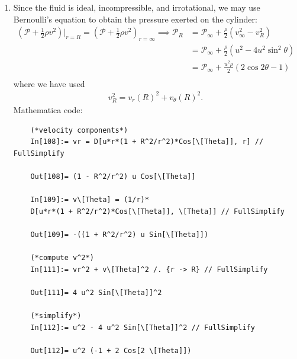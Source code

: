 \documentclass{article}
\theoremstyle{definition}
\newcommand{\f}[2]{\frac{#1}{#2}}
\newcommand{\lp}{\left(}
\newcommand{\rp}{\right)}
\begin{document}
\begin{enumerate}[label=(\alph*)]
	\item Since the fluid is ideal, incompressible, and irrotational, we may use Bernoulli's equation to obtain the pressure exerted on the cylinder: 
	\begin{align*}
	\lp \mathcal{P} + \f{1}{2}\rho v^2 \rp\bigg\vert_{r= R} = \lp \mathcal{P} + \f{1}{2}\rho v^2  \rp_{r=\infty} \implies \mathcal{P}_R
	& = \mathcal{P}_\infty + \f{\rho}{2}(v^2_\infty - {v^2_R})\\ 
	&= \mathcal{P}_\infty + \f{\rho}{2}(u^2 - 4u^2\sin^2\theta) \\
	&= \boxed{\mathcal{P}_\infty + \f{u^2\rho}{2}(2\cos 2 \theta - 1)} \\
	\end{align*}
	where we have used 
	\begin{align*}
	v_R^2 = v_r(R)^2 + v_\theta(R)^2.
	\end{align*}
	Mathematica code:
	\begin{lstlisting}
	(*velocity components*)
	In[108]:= vr = D[u*r*(1 + R^2/r^2)*Cos[\[Theta]], r] // FullSimplify
	
	Out[108]= (1 - R^2/r^2) u Cos[\[Theta]]
	
	In[109]:= v\[Theta] = (1/r)*
	D[u*r*(1 + R^2/r^2)*Cos[\[Theta]], \[Theta]] // FullSimplify
	
	Out[109]= -((1 + R^2/r^2) u Sin[\[Theta]])
	
	(*compute v^2*)
	In[111]:= vr^2 + v\[Theta]^2 /. {r -> R} // FullSimplify
	
	Out[111]= 4 u^2 Sin[\[Theta]]^2
	
	(*simplify*)
	In[112]:= u^2 - 4 u^2 Sin[\[Theta]]^2 // FullSimplify
	
	Out[112]= u^2 (-1 + 2 Cos[2 \[Theta]])
	\end{lstlisting}
	

\end{enumerate}
\end{document}
